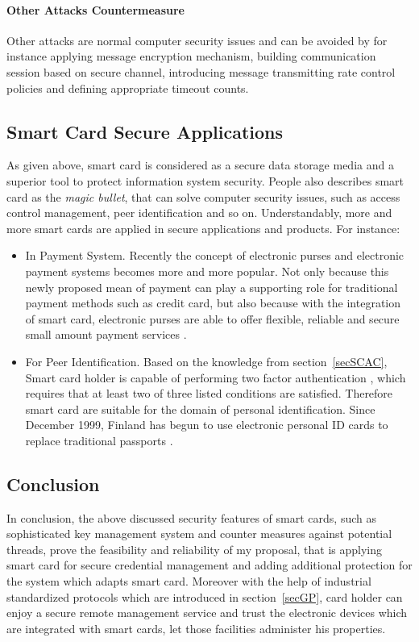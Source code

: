 \paragraph{Other Attacks Countermeasure}
Other attacks are normal computer security issues and can be avoided by for instance applying message encryption mechanism, building communication session based on secure channel, introducing message transmitting rate control policies and defining appropriate timeout counts.
\subsection{Smart Card Secure Applications}
As given above, smart card is considered as a secure data storage media and a superior tool to protect information system security. People also describes smart card as the \emph{magic bullet}, that can solve computer security issues, such as access control management, peer identification and so on. Understandably, more and more smart cards are applied in secure applications and products. For instance:
\begin{itemize}
\item In Payment System. Recently the concept of electronic purses and electronic payment systems becomes more and more popular. Not only because this newly proposed mean of payment can play a supporting role for traditional payment methods such as credit card, but also because with the integration of smart card, electronic purses are able to offer flexible, reliable and secure small amount payment  services \cite{handbook}.
\item For Peer Identification. Based on the knowledge from section~\ref{secSCAC}, Smart card holder is  capable of performing two factor authentication \cite{smart_card_history}, which requires that at least two of three listed conditions are satisfied. Therefore smart card are suitable for the domain of personal identification. Since December 1999, Finland has begun to use electronic personal ID cards to replace traditional passports \cite{handbook}. 
\end{itemize}
\subsection{Conclusion}
In conclusion, the above discussed security features of smart cards, such as sophisticated key management system and counter measures against potential threads, prove the feasibility and reliability of my proposal, that is applying smart card for secure credential management and adding additional protection for the system which adapts smart card. Moreover with the help of industrial standardized protocols which are introduced in section~\ref{secGP}, card holder can enjoy a secure remote management service and trust the electronic devices which are integrated with smart cards, let those facilities administer his properties.  

